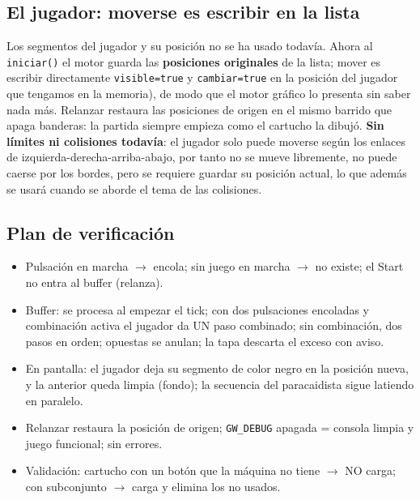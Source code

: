 \subsection{El jugador: moverse es escribir en la lista}
\label{subsec:Jugador}

Los segmentos del jugador y su posición no se ha usado todavía. Ahora al \texttt{iniciar()} el motor guarda las \textbf{posiciones originales} de la lista; mover es escribir directamente \texttt{visible=true} y \texttt{cambiar=true} en la posición del jugador que tengamos en la memoria), de modo que el motor gráfico lo presenta sin saber nada más. Relanzar restaura las posiciones de origen en el mismo barrido que apaga banderas:
la partida siempre empieza como el cartucho la dibujó. \textbf{Sin límites ni colisiones
	todavía}: el jugador solo puede moverse según los enlaces de izquierda-derecha-arriba-abajo, por tanto no se mueve libremente, no puede caerse por los bordes, pero se requiere guardar su posición actual, lo que además se usará cuando se aborde el tema de las colisiones.

\subsection{Plan de verificación}
\label{subsec:VerificacionF3I1}

\begin{itemize}
	\item Pulsación en marcha $\rightarrow$ encola; sin juego en marcha $\rightarrow$ no
	existe; el Start no entra al buffer (relanza).
	\item Buffer: se procesa al empezar el tick; con dos pulsaciones encoladas y
	combinación activa el jugador da UN paso combinado; sin combinación, dos pasos en
	orden; opuestas se anulan; la tapa descarta el exceso con aviso.
	\item En pantalla: el jugador deja su segmento de color negro en la posición nueva, y la anterior queda limpia (fondo); la secuencia del paracaidista sigue latiendo
	en paralelo.
	\item Relanzar restaura la posición de origen; \texttt{GW\_DEBUG} apagada = consola
	limpia y juego funcional; sin errores.
	\item Validación: cartucho con un botón que la máquina no tiene $\rightarrow$ NO
	carga; con subconjunto $\rightarrow$ carga y elimina los no usados.
\end{itemize}

\clearpage